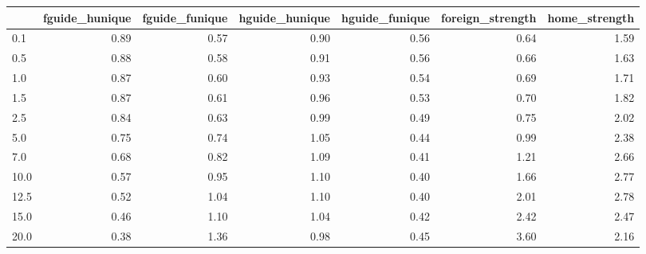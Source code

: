 \begin{tabular}{lrrrrrr}
\toprule
 & fguide_hunique & fguide_funique & hguide_hunique & hguide_funique & foreign_strength & home_strength \\
\midrule
0.1 & 0.89 & 0.57 & 0.90 & 0.56 & 0.64 & 1.59 \\
0.5 & 0.88 & 0.58 & 0.91 & 0.56 & 0.66 & 1.63 \\
1.0 & 0.87 & 0.60 & 0.93 & 0.54 & 0.69 & 1.71 \\
1.5 & 0.87 & 0.61 & 0.96 & 0.53 & 0.70 & 1.82 \\
2.5 & 0.84 & 0.63 & 0.99 & 0.49 & 0.75 & 2.02 \\
5.0 & 0.75 & 0.74 & 1.05 & 0.44 & 0.99 & 2.38 \\
7.0 & 0.68 & 0.82 & 1.09 & 0.41 & 1.21 & 2.66 \\
10.0 & 0.57 & 0.95 & 1.10 & 0.40 & 1.66 & 2.77 \\
12.5 & 0.52 & 1.04 & 1.10 & 0.40 & 2.01 & 2.78 \\
15.0 & 0.46 & 1.10 & 1.04 & 0.42 & 2.42 & 2.47 \\
20.0 & 0.38 & 1.36 & 0.98 & 0.45 & 3.60 & 2.16 \\
\bottomrule
\end{tabular}
